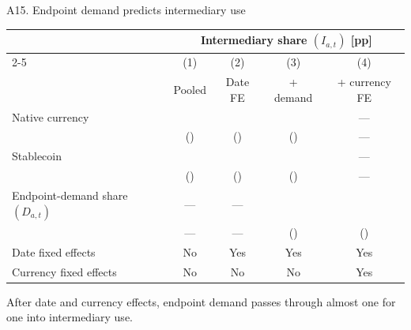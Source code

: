 \begin{frame}{A15. Endpoint demand predicts intermediary use}
\centering
{\scriptsize
\renewcommand{\arraystretch}{0.96}
\begin{tabularx}{0.94\textwidth}{@{}Xcccc@{}}
\toprule
 & \multicolumn{4}{c}{Intermediary share \((I_{a,t})\) [pp]} \\
\cmidrule(lr){2-5}
 & (1) & (2) & (3) & (4) \\
 & Pooled & Date FE & {}+ demand & {}+ currency FE \\
\midrule
Native currency & \DateFEPooledNativeTable{} & \DateFEDayNativeTable{} & \DateFEDemandNativeTable{} & --- \\
 & (\DateFEPooledNativeTableSE{}) & (\DateFEDayNativeTableSE{}) & (\DateFEDemandNativeTableSE{}) & --- \\
Stablecoin & \DateFEPooledStableTable{} & \DateFEDayStableTable{} & \DateFEDemandStableTable{} & --- \\
 & (\DateFEPooledStableTableSE{}) & (\DateFEDayStableTableSE{}) & (\DateFEDemandStableTableSE{}) & --- \\
Endpoint-demand share \((D_{a,t})\) & --- & --- & \DateFESlopeTable{} & \DateFESlopeWithinTokenTable{} \\
 & --- & --- & (\DateFESlopeTableSE{}) & (\DateFESlopeWithinTokenTableSE{}) \\
\midrule
Date fixed effects & No & Yes & Yes & Yes \\
Currency fixed effects & No & No & No & Yes \\
\bottomrule
\end{tabularx}\par}
\vspace{0.06cm}
{\footnotesize After date and currency effects, endpoint demand passes through almost one for one into intermediary use.\par}
\end{frame}

